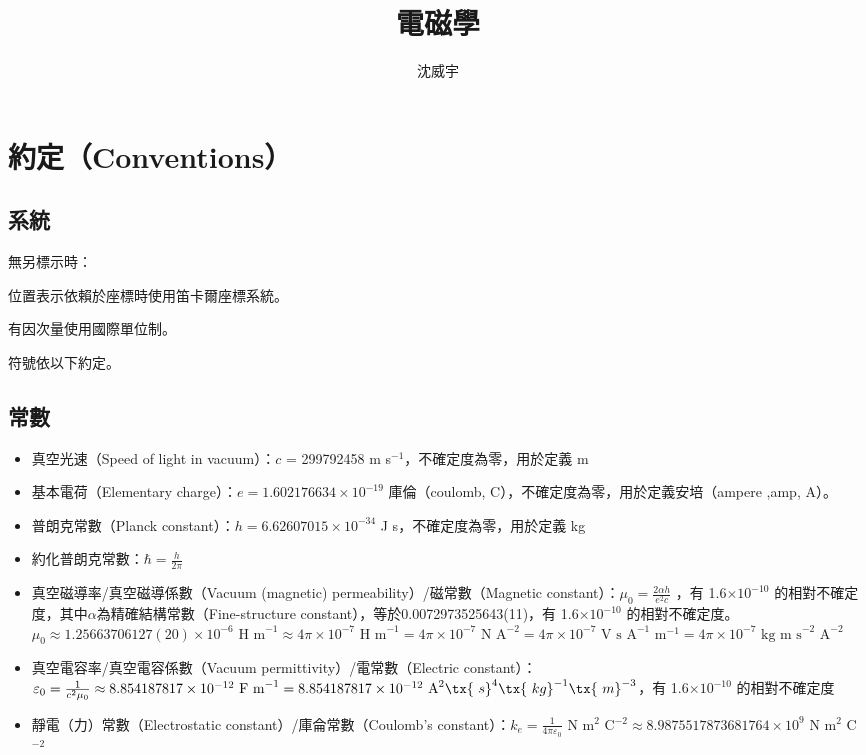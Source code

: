 \documentclass[a4paper,12pt]{report}
\begin{document}
\title{電磁學}
\author{沈威宇}
\date{\temtoday}
\titletocdoc
{}


\section{約定（Conventions）}
\subsection{系統}
無另標示時：
\bit
\item 位置表示依賴於座標時使用笛卡爾座標系統。
\item 有因次量使用國際單位制。
\item 符號依以下約定。
\eit
\subsection{常數}
\begin{itemize}
\item 真空光速（Speed of light in vacuum）：$c$ = 299792458 m s$^{-1}$，不確定度為零，用於定義 m
\item 基本電荷（Elementary charge）：$e = 1.602176634 \times 10^{-19}$ 庫倫（coulomb, C），不確定度為零，用於定義安培（ampere ,amp, A）。
\item 普朗克常數（Planck constant）：$h = 6.62607015 \times 10^{-34}$ J s，不確定度為零，用於定義 kg
\item 約化普朗克常數：$\hbar=\frac{h}{2\pi}$
\item 真空磁導率/真空磁導係數（Vacuum (magnetic) permeability）/磁常數（Magnetic constant）：$\mu_0 = \frac{2\alpha h}{e^2c}$ ，有 1.6$\times 10^{-10}$ 的相對不確定度，其中$\alpha$為精確結構常數（Fine-structure constant），等於0.0072973525643(11)，有 1.6$\times 10^{-10}$ 的相對不確定度。$\mu_0\approx 1.25663706127(20)\times 10^{-6}\text{\ H m}^{-1}\approx 4\pi\times 10^{-7} \text{\ H m}^{-1} = 4\pi\times 10^{-7} \text{\ N A}^{-2} = 4\pi\times 10^{-7} \text{\ V s A}^{-1} \text{\ m}^{-1}  = 4\pi\times 10^{-7} \text{\ kg m s}^{-2} \text{\ A}^{-2}$ 
\item 真空電容率/真空電容係數（Vacuum permittivity）/電常數（Electric constant）：$\varepsilon_0 = \frac{1}{c^2\mu_0} \approx 8.854187817 \times 10^{-12} \text{\ F m}^{-1} = 8.854187817 \times 10^{-12} \text{\ A}^2\tx{\ s}^4\tx{\ kg}^{-1}\tx{\ m}^{-3}$，有 1.6$\times 10^{-10}$ 的相對不確定度
\item 靜電（力）常數（Electrostatic constant）/庫侖常數（Coulomb's constant）：$k_e = \frac{1}{4\pi\varepsilon_0}$ N m$^2$ C$^{-2} \approx 8.9875517873681764 \times 10^{9}$ N m$^2$ C$^{-2}$
\end{itemize}
\end{document}
